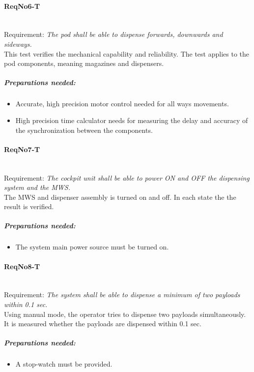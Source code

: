 \paragraph{ReqNo6-T}\mbox{}\\ %
Requirement: \textit{The pod shall be able to dispense forwards, downwards and sideways.}\\
This test verifies the mechanical capability and reliability. The test applies to the pod components, meaning magazines and dispensers.
	\subparagraph{Preparations needed:}
	\begin{itemize}
	\item Accurate, high precision motor control needed for all ways movements.
	\item High precision time calculator needs for measuring the delay and accuracy of the synchronization between the components.
	\end{itemize}

\paragraph{ReqNo7-T}\mbox{}\\ %
Requirement: \textit{The cockpit unit shall be able to power ON and OFF the dispensing system and the MWS.}
\\
The MWS and dispenser assembly is turned on and off. In each state the the result is verified.

	\subparagraph{Preparations needed:}
	\begin{itemize}
	\item The system main power source must be turned on.
	\end{itemize}


\paragraph{ReqNo8-T}\mbox{}\\ %
Requirement: \textit{The system shall be able to dispense a minimum of two payloads within 0.1 sec.}
\\
Using manual mode, the operator tries to dispense two payloads simultaneously. It is measured whether the payloads are dispensed within 0.1 sec.
\\
	\subparagraph{Preparations needed:}
	\begin{itemize}
	\item A stop-watch must be provided.
	\end{itemize}

